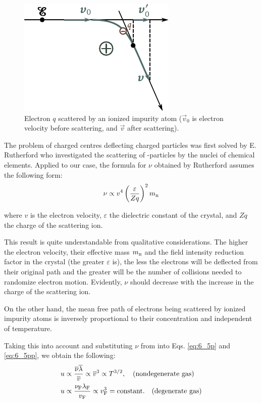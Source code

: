 \begin{figure}[t]
	\begin{center}
		\includegraphics[scale=1]{figures/ch_06/fig_6_6.pdf}
		\caption[]{Electron $q$ scattered by an ionized impurity atom ($\vec{v}_0$ is electron velocity before scattering, and $\vec{v}$ after scattering).}
		\label{fig:6_6}
	\end{center}
	\vspace{-0.7cm}
\end{figure}

The problem of charged centres deflecting charged particles was first solved by E. Rutherford who investigated the scattering of \ce{\alpha}-particles by the nuclei of chemical elements. Applied to our case, the formula for $\nu$ obtained by Rutherford assumes the following form:
\begin{equation}\label{eq:6_21}
    \nu \propto v^4 \left(\frac{\varepsilon}{Z q}\right)^2 m_{\text{n}}
\end{equation}

\noindent
where $v$ is the electron velocity, $\varepsilon$ the dielectric constant of the crystal, and $Zq$ the charge of the scattering ion.

This result is quite understandable from qualitative considerations. The higher the electron velocity, their effective mass $m_{\text{n}}$ and the field intensity reduction factor in the crystal (the greater $\varepsilon$ is), the less the electrons will be deflected from their original path and the greater will be the number of collisions needed to randomize electron motion. Evidently, $\nu$ should decrease with the increase in the charge of the scattering ion.

On the other hand, the mean free path of electrons being scattered by ionized impurity atoms is inversely proportional to their concentration and independent of temperature.

Taking this into account and substituting $\nu$ from  into Eqs. \eqref{eq:6_5p} and \eqref{eq:6_5pp}, we obtain the following:
\begin{align}
    u &\propto \frac{\overline{\nu}\overline{\lambda}}{\overline{v}} \propto \overline{v}^3 \propto T^{3/2},\quad \text{(nondegenerate gas)} \label{eq:6_22}\\
    u &\propto \frac{\nu_{\text{F}}\lambda_{\text{F}}}{v_{\text{F}}} \propto v_{\text{F}}^3 = \text{constant}. \quad \text{(degenerate gas)}\label{eq:6_23}
\end{align}

